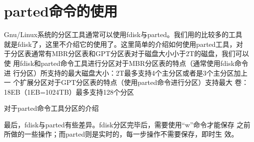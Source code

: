 
\section{parted命令的使用}
\label{sec:PartedCmd}

Gnu/Linux系统的分区工具通常可以使用fdisk与parted。我们用的比较多的工具
就是fdisk了，这里不介绍它的使用了。这里简单的介绍如何使用parted工具，对
于分区表通常有MBR分区表和GPT分区表对于磁盘大小小于2T的磁盘，我们可以使
用fdisk和parted命令工具进行分区对于MBR分区表的特点（通常使用fdisk命令进
行分区）所支持的最大磁盘大小：2T最多支持4个主分区或者是3个主分区加上一
个扩展分区对于GPT分区表的特点（使用parted命令进行分区）支持最大
卷：18EB（1EB=1024TB）最多支持128个分区

对于parted命令工具分区的介绍

最后，fdisk与parted有些差异。fdisk分区完毕后，需要使用“w”命令才能保存
之前所做的一些操作；而parted则是实时的，每一步操作不需要保存，即时生
效。